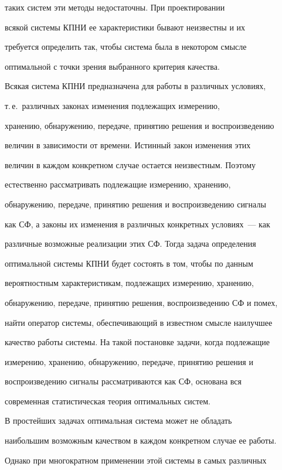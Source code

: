  таких систем эти методы недостаточны. При проектировании


 всякой системы КПНИ ее характеристики бывают неизвестны и их


 требуется определить так, чтобы система была в некотором смысле


 оптимальной с точки зрения выбранного критерия качества.





Всякая система КПНИ предназначена для работы в различных условиях, 


т.\,е.\ различных законах изменения подлежащих измерению,


хранению, обнаружению, передаче, принятию решения и воспроизведению


величин в зависимости от времени. Истинный закон изменения этих


величин в каждом конкретном случае остается неизвестным. Поэтому


естественно рассматривать подлежащие измерению, хранению,


обнаружению, передаче, принятию решения и воспроизведению сигналы


как СФ, а законы их изменения в различных конкретных условиях~--- как


различные возможные реализации этих СФ. Тогда задача определения


оптимальной системы КПНИ будет состоять в том, чтобы по данным


вероятностным характеристикам, подлежащих измерению, хранению,


обнаружению, передаче, принятию решения, воспроизведению СФ и помех,


найти оператор системы, обеспечивающий в известном смысле наилучшее


качество работы системы. На такой постановке задачи, когда подлежащие


измерению, хранению, обнаружению, передаче, принятию решения и


воспроизведению сигналы рассматриваются как СФ, основана вся


современная статистическая теория оптимальных систем.





В простейших задачах оптимальная система может не обладать


наибольшим возможным качеством в каждом конкретном случае ее работы.


Однако при многократном применении этой системы в самых различных


